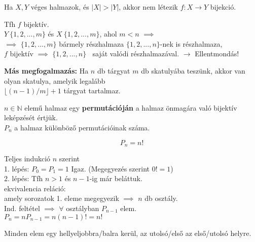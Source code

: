 \begin{frame}
  \begin{tcolorbox}[title={Tétel: Skatulya-elv}]
    Ha $X, Y$ véges halmazok, és $|X| > |Y|$, akkor nem létezik $f: X \rightarrow Y$ bijekció.
  \end{tcolorbox}

  \begin{tcolorbox}[title={Bizonyítás (Indirekt)}]
    Tfh $f$ bijektív.\\
    $Y ~ \{1, 2, ..., m\}$ és $X ~ \{1, 2, ..., m\}$, ahol $m < n$ $\implies$\\
    $\implies$ $\{1, 2, ..., m\}$ bármely részhalmaza $\{1, 2, ..., n\}$-nek is részhalmaza,\\
    $f$ bijektív $\implies$ $\{1, 2, ..., n\}$ $~$ saját valódi részhalmazával. $\rightarrow$ Ellentmondás!\\
    \bigskip

    \textbf{Más megfogalmazás:} Ha $n$ db tárgyat $m$ db skatulyába teszünk, akkor van olyan skatulya, amelyik legalább\\
    $\lfloor (n - 1) / m \rfloor + 1$ tárgyat tartalmaz.
  \end{tcolorbox}
\end{frame}

\begin{frame}
  \begin{tcolorbox}[title={Def.: Permutáció}]
    $n \in \mathbb{N}$ elemű halmaz egy \textbf{permutációján} a halmaz önmagára való bijektív leképzését értjük.\\
    $P_n$ a halmaz különböző permutációinak száma.
  \end{tcolorbox}

  \begin{tcolorbox}[title={Tétel: Permutációk száma}]
    $$P_n = n!$$
  \end{tcolorbox}

  \begin{tcolorbox}[title={Bizonyítás}]
    Teljes indukció $n$ szerint\\
    1. lépés: $P_0 = P_1 = 1$ Igaz. (Megegyezés szerint $0! = 1$)\\
    2. lépés: Tfh $n > 1$ és $n - 1$-ig már beláttuk.\\
    ekvivalencia reláció:\\
    amely sorozatok 1. eleme megegyezik $\implies$ $n$ db osztály.\\
    Ind. feltétel $\implies$ $\forall$ osztályban $P_{n - 1}$ elem.\\
    $P_n = nP_{n - 1} = n(n - 1)! = n!$
  \end{tcolorbox}

  \begin{tcolorbox}[title={Def.: Ciklikus permutáció}]
    Minden elem egy hellyeljobbra/balra kerül, az utolsó/első az első/utolsó helyre.
  \end{tcolorbox}
\end{frame}

